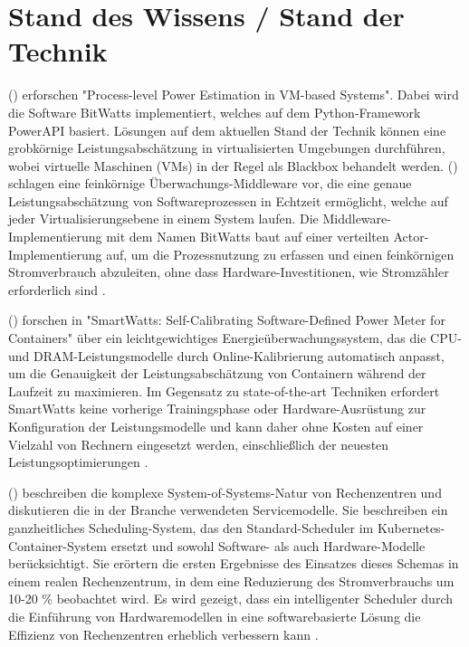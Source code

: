 \chapter{Stand des Wissens / Stand der Technik}

\citeauthor{colmant:hal-01130030} (\citeyear{colmant:hal-01130030})
erforschen "Process-level Power Estimation in VM-based Systems".
Dabei wird die Software BitWatts implementiert,
welches auf dem Python-Framework PowerAPI basiert.
Lösungen auf dem aktuellen Stand der Technik können eine grobkörnige Leistungsabschätzung 
in virtualisierten Umgebungen durchführen, 
wobei virtuelle Maschinen (VMs) in der Regel als Blackbox behandelt werden.
\citeauthor{colmant:hal-01130030} (\citeyear{colmant:hal-01130030})
schlagen eine feinkörnige Überwachungs-Middleware vor, 
die eine genaue Leistungsabschätzung von Softwareprozessen in Echtzeit ermöglicht, 
welche auf jeder Virtualisierungsebene in einem System laufen.
Die Middleware-Implementierung mit dem Namen BitWatts 
baut auf einer verteilten Actor-Implementierung auf, 
um die Prozessnutzung zu erfassen und einen feinkörnigen Stromverbrauch abzuleiten, 
ohne dass Hardware-Investitionen, wie Stromzähler erforderlich sind
\autocite{colmant:hal-01130030}.
\bigskip

\citeauthor{fieni:hal-02470128} (\citeyear{fieni:hal-02470128})
forschen in
"SmartWatts: Self-Calibrating Software-Defined Power Meter for Containers"
über ein leichtgewichtiges Energieüberwachungssystem, das die CPU- und DRAM-Leistungsmodelle 
durch Online-Kalibrierung automatisch anpasst, um die Genauigkeit der Leistungsabschätzung von Containern 
während der Laufzeit zu maximieren. Im Gegensatz zu state-of-the-art Techniken erfordert SmartWatts keine vorherige
Trainingsphase oder Hardware-Ausrüstung zur Konfiguration der Leistungsmodelle und kann daher ohne Kosten 
auf einer Vielzahl von Rechnern eingesetzt werden, einschließlich der neuesten Leistungsoptimierungen
\autocite{fieni:hal-02470128}.
\bigskip

\citeauthor{8705815} (\citeyear{8705815})
beschreiben die komplexe System-of-Systems-Natur von Rechenzentren und diskutieren 
die in der Branche verwendeten Servicemodelle. Sie beschreiben ein ganzheitliches Scheduling-System, 
das den Standard-Scheduler im Kubernetes-Container-System ersetzt 
und sowohl Software- als auch Hardware-Modelle berücksichtigt. 
Sie erörtern die ersten Ergebnisse des Einsatzes dieses Schemas in einem realen Rechenzentrum, 
in dem eine Reduzierung des Stromverbrauchs um 10-20 \% beobachtet wird. 
Es wird gezeigt, dass ein intelligenter Scheduler durch die Einführung von Hardwaremodellen 
in eine softwarebasierte Lösung die Effizienz von Rechenzentren erheblich verbessern kann
\autocite{8705815}.



